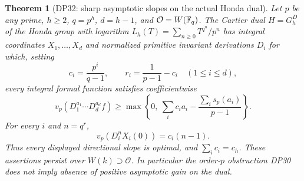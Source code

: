 \documentclass[11pt,a4paper]{article}
\newtheorem{theorem}{Theorem}[section]
\theoremstyle{definition}\newtheorem{remark}[theorem]{Remark}
\begin{document}
\begin{theorem}[DP32: sharp asymptotic slopes on the actual Honda dual]\label{DP32}
Let $p$ be any prime, $h\ge2$, $q=p^h$, $d=h-1$, and $\mathcal O=W(\mathbb F_q)$. The Cartier dual $H=G_h^D$ of the Honda group with logarithm $L_h(T)=\sum_{n\ge0}T^{q^n}/p^n$ has integral coordinates $X_1,\ldots,X_d$ and normalized primitive invariant derivations $D_i$ for which, setting
\[
 c_i=\frac{p^i}{q-1},\qquad r_i=\frac1{p-1}-c_i\quad(1\le i\le d),
\]
every integral formal function satisfies coefficientwise
\begin{equation}\label{eq:dual-mixed}
 v_p(D_1^{a_1}\cdots D_d^{a_d}f)
 \ge\max\left\{0,\ \sum_i c_i a_i-\frac{\sum_i s_p(a_i)}{p-1}\right\}.
\end{equation}
For every $i$ and $n=q^r$,
\begin{equation}\label{eq:dual-sharp}
 v_p(D_i^nX_i(0))=c_i(n-1).
\end{equation}
Thus every displayed directional slope is optimal, and $\sum_i c_i=c_h$. These assertions persist over $W(k)\supset\mathcal O$. In particular the order-$p$ obstruction DP30 does not imply absence of positive asymptotic gain on the dual.
\end{theorem}
\end{document}
